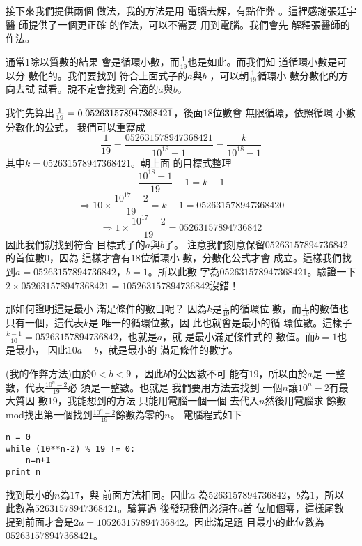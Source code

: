 \documentclass[12pt]{article}
\begin{document}
接下來我們提供兩個%
做法，我的方法是用%
電腦去解，有點作弊%
。這裡感謝張廷宇醫%
師提供了一個更正確%
的作法，可以不需要%
用到電腦。我們會先%
解釋張醫師的作法。

\bigskip

通常$1$除以質數的結果%
會是循環小數，而$\frac{1}{19}
$也是如此。而我們知%
道循環小數是可以分%
數化的。我們要找到%
符合上面式子的$a$與$b$%
，可以朝$\frac{1}{19}$循環小%
數分數化的方向去試%
試看。說不定會找到%
合適的$a$與$b$。

\bigskip

我們先算出$\frac{1}{19}=0.\overline{%
052631578947368421}$，後面$18$位數會%
無限循環，依照循環%
小數分數化的公式，%
我們可以重寫成%
\[
\frac{1}{19}=\frac{052631578947368421}{10^{18}-1}=\frac{k}{10^{18}-1} 
\]%
其中$k=052631578947368421$。朝上面%
的目標式整理%
\[
\frac{10^{18}-1}{19}-1=k-1 
\]%
\[
\Rightarrow 10\times \frac{10^{17}-2}{19}=k-1=052631578947368420 
\]%
\[
\Rightarrow 1\times \frac{10^{17}-2}{19}=05263157894736842 
\]%
因此我們就找到符合%
目標式子的$a$與$b$了。%
注意我們刻意保留$%
05263157894736842$的首位數$0$，因為%
這樣才會有$18$位循環小%
數，分數化公式才會%
成立。這樣我們找到$%
a=05263157894736842$，$b=1$。所以此數%
字為$052631578947368421$。驗證一下$%
2\times 052631578947368421=105263157894736842$沒錯！

\bigskip

那如何證明這是最小%
滿足條件的數目呢？%
因為$k$是$\frac{1}{19}$的循環位%
數，而$\frac{1}{19}$的數值也%
只有一個，這代表$k$是%
唯一的循環位數，因%
此也就會是最小的循%
環位數。這樣子$\frac{k-1}{10}%
=05263157894736842$，也就是$a$，就%
是最小滿足條件式的%
數值。而$b=1$也是最小，%
因此$10a+b$，就是最小的%
滿足條件的數字。

\bigskip

(我的作弊方法)由於$0<b<9$%
，因此$b$的公因數不可%
能有$19$，所以由於$a$是%
一整數，代表$\frac{10^{n}-2}{19}$必%
須是一整數。也就是%
我們要用方法去找到%
一個$n$讓$10^{n}-2$有最大質因%
數$19$，我能想到的方法%
只能用電腦一個一個%
去代入$n$然後用電腦求%
餘數mod找出第一個找到$%
\frac{10^{n}-2}{19}$餘數為零的$n$。%
電腦程式如下
\begin{verbatim}
n = 0
while (10**n-2) % 19 != 0:
    n=n+1
print n
\end{verbatim}

找到最小的$n$為$17$，與%
前面方法相同。因此$a$%
為$5263157894736842$，$b$為$1$，所以%
此數為$52631578947368421$。驗算過%
後發現我們必須在$a$首%
位加個零，這樣尾數%
提到前面才會是$%
2a=105263157894736842$。因此滿足題%
目最小的此位數為$%
052631578947368421$。
\end{document}
